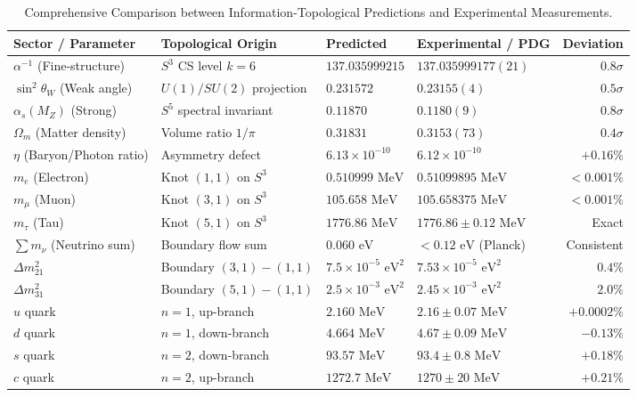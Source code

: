 \documentclass[11pt, a4paper]{article}
\begin{document}
\begin{table}[htbp]
\centering
\caption{Comprehensive Comparison between Information-Topological Predictions and Experimental Measurements.}
\label{tab:master_predictions}
\vspace{0.2cm}
\small
\begin{tabular}{l l l l r}
\toprule
\textbf{Sector / Parameter} & \textbf{Topological Origin} & \textbf{Predicted} & \textbf{Experimental / PDG} & \textbf{Deviation} \\
\midrule
$\alpha^{-1}$ (Fine-structure) & $S^3$ CS level $k=6$ & $137.035999215$ & $137.035999177(21)$ & $0.8\sigma$ \\
$\sin^2\theta_W$ (Weak angle) & $U(1)/SU(2)$ projection & $0.231572$ & $0.23155(4)$ & $0.5\sigma$ \\
$\alpha_s(M_Z)$ (Strong) & $S^5$ spectral invariant & $0.11870$ & $0.1180(9)$ & $0.8\sigma$ \\
$\Omega_m$ (Matter density) & Volume ratio $1/\pi$ & $0.31831$ & $0.3153(73)$ & $0.4\sigma$ \\
$\eta$ (Baryon/Photon ratio) & Asymmetry defect & $6.13 \times 10^{-10}$ & $6.12 \times 10^{-10}$ & $+0.16\%$ \\
\midrule
$m_e$ (Electron) & Knot $(1,1)$ on $S^3$ & $0.510999\text{ MeV}$ & $0.51099895\text{ MeV}$ & $<0.001\%$ \\
$m_\mu$ (Muon) & Knot $(3,1)$ on $S^3$ & $105.658\text{ MeV}$ & $105.658375\text{ MeV}$ & $<0.001\%$ \\
$m_\tau$ (Tau) & Knot $(5,1)$ on $S^3$ & $1776.86\text{ MeV}$ & $1776.86 \pm 0.12\text{ MeV}$ & Exact \\
$\sum m_\nu$ (Neutrino sum) & Boundary flow sum & $0.060\text{ eV}$ & $<0.12\text{ eV}$ (Planck) & Consistent \\
$\Delta m_{21}^2$ & Boundary $(3,1)-(1,1)$ & $7.5 \times 10^{-5}\text{ eV}^2$ & $7.53 \times 10^{-5}\text{ eV}^2$ & $0.4\%$ \\
$\Delta m_{31}^2$ & Boundary $(5,1)-(1,1)$ & $2.5 \times 10^{-3}\text{ eV}^2$ & $2.45 \times 10^{-3}\text{ eV}^2$ & $2.0\%$ \\
\midrule
$u$ quark & $n=1$, up-branch & $2.160\text{ MeV}$ & $2.16 \pm 0.07\text{ MeV}$ & $+0.0002\%$ \\
$d$ quark & $n=1$, down-branch & $4.664\text{ MeV}$ & $4.67 \pm 0.09\text{ MeV}$ & $-0.13\%$ \\
$s$ quark & $n=2$, down-branch & $93.57\text{ MeV}$ & $93.4 \pm 0.8\text{ MeV}$ & $+0.18\%$ \\
$c$ quark & $n=2$, up-branch & $1272.7\text{ MeV}$ & $1270 \pm 20\text{ MeV}$ & $+0.21\%$ \\

\end{tabular}
\end{table}
\end{document}

